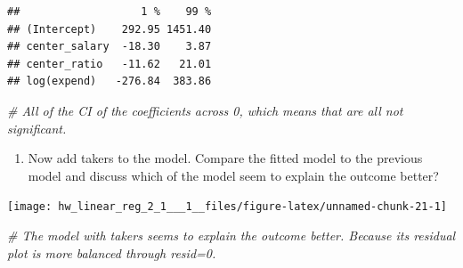 \documentclass[]{article}
\newenvironment{Shaded}{\begin{snugshade}}{\end{snugshade}}
\newcommand{\KeywordTok}[1]{\textcolor[rgb]{0.13,0.29,0.53}{\textbf{#1}}}
\newcommand{\DataTypeTok}[1]{\textcolor[rgb]{0.13,0.29,0.53}{#1}}
\newcommand{\CommentTok}[1]{\textcolor[rgb]{0.56,0.35,0.01}{\textit{#1}}}
\newcommand{\OperatorTok}[1]{\textcolor[rgb]{0.81,0.36,0.00}{\textbf{#1}}}
\newcommand{\NormalTok}[1]{#1}
\providecommand{\tightlist}{%
  \setlength{\itemsep}{0pt}\setlength{\parskip}{0pt}}
\begin{document}
\begin{verbatim}
##                   1 %    99 %
## (Intercept)    292.95 1451.40
## center_salary  -18.30    3.87
## center_ratio   -11.62   21.01
## log(expend)   -276.84  383.86
\end{verbatim}

\begin{Shaded}
\begin{Highlighting}[]
\CommentTok{# All of the CI of the coefficients across 0, which means that are all not significant.}
\end{Highlighting}
\end{Shaded}

\begin{enumerate}
\def\labelenumi{\arabic{enumi}.}
\setcounter{enumi}{2}
\tightlist
\item
  Now add takers to the model. Compare the fitted model to the previous
  model and discuss which of the model seem to explain the outcome
  better?
\end{enumerate}

\begin{Shaded}
\end{Shaded}

\begin{center}\texttt{[image: hw\_linear\_reg\_2\_1\_\_\_1\_\_files/figure-latex/unnamed-chunk-21-1]} \end{center}

\begin{Shaded}
\begin{Highlighting}[]
\CommentTok{# The model with takers seems to explain the outcome better. Because its residual plot is more balanced through resid=0.}
\end{Highlighting}
\end{Shaded}
\end{document}
